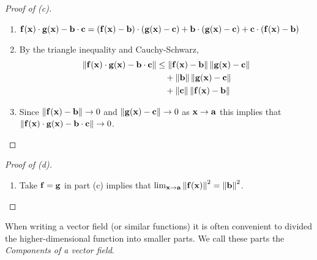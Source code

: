 \begin{proof}[Proof of (c)]
    \begin{enumerate}
        \item
              \(
              \mathbf{f}(\mathbf{x})\cdot\mathbf{g}(\mathbf{x}) - \mathbf{b}\cdot \mathbf{c}
              = (\mathbf{f}(\mathbf{x})-\mathbf{b})\cdot(\mathbf{g}(\mathbf{x})-\mathbf{c}) + \mathbf{b}\cdot(\mathbf{g}(\mathbf{x})-\mathbf{c}) + \mathbf{c}\cdot(\mathbf{f}(\mathbf{x})-\mathbf{b})
              \)
        \item By the triangle inequality and Cauchy-Schwarz,
              \[
                  \begin{aligned}
                      \left\|\mathbf{f}(\mathbf{x})\cdot\mathbf{g}(\mathbf{x}) - \mathbf{b}\cdot \mathbf{c} \right\|
                       & \leq \left\|\mathbf{f}(\mathbf{x})-\mathbf{b}\right\| \left\|\mathbf{g}(\mathbf{x})-\mathbf{c}\right\| \\
                       & \quad + \left\|\mathbf{b}\right\|\left\|\mathbf{g}(\mathbf{x})-\mathbf{c}\right\|        \\
                       & \quad + \left\|\mathbf{c}\right\| \left\|\mathbf{f}(\mathbf{x})-\mathbf{b}\right\|
                  \end{aligned}
              \]
        \item Since \(\left\|\mathbf{f}(\mathbf{x})-\mathbf{b}\right\| \to 0\) and \(\left\|\mathbf{g}(\mathbf{x})-\mathbf{c}\right\| \to 0\) as \(\mathbf{x} \to \mathbf{a}\) this implies that \(\left\|\mathbf{f}(\mathbf{x})\cdot\mathbf{g}(\mathbf{x}) - \mathbf{b}\cdot \mathbf{c} \right\|\to 0\).
    \end{enumerate}
\end{proof}

\begin{proof}[Proof of (d)]
    \begin{enumerate}
        \item Take \(\mathbf{f} = \mathbf{g}\) in part (c) implies that \(   \lim_{\mathbf{x} \to \mathbf{a}} \left\|\mathbf{f}(\mathbf{x})\right\|^2 = \left\|\mathbf{b}\right\|^2\).
    \end{enumerate}
\end{proof}


When writing a vector field (or similar functions) it is often convenient to divided the higher-dimensional function into smaller parts.
We call these parts the \emph{Components of a vector field}.


